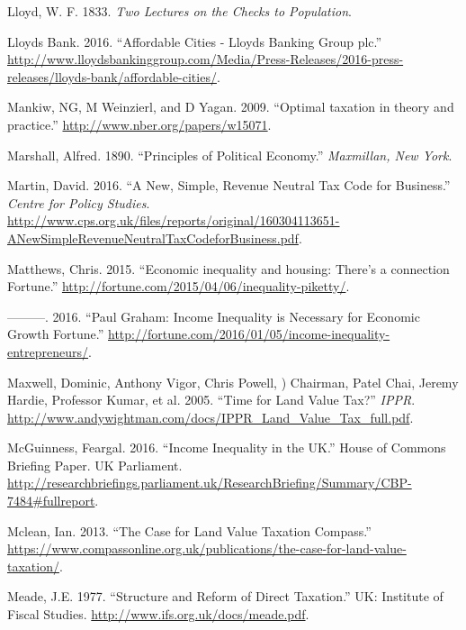 \documentclass[]{tufte-handout}
\begin{document}
\leavevmode\hypertarget{ref-Lloyd1833}{}%
Lloyd, W. F. 1833. \emph{Two Lectures on the Checks to Population}.

\leavevmode\hypertarget{ref-LloydsBank2016}{}%
Lloyds Bank. 2016. ``Affordable Cities - Lloyds Banking Group plc.''
\url{http://www.lloydsbankinggroup.com/Media/Press-Releases/2016-press-releases/lloyds-bank/affordable-cities/}.

\leavevmode\hypertarget{ref-Mankiw2009}{}%
Mankiw, NG, M Weinzierl, and D Yagan. 2009. ``Optimal taxation in theory
and practice.'' \url{http://www.nber.org/papers/w15071}.

\leavevmode\hypertarget{ref-marshall1890principles}{}%
Marshall, Alfred. 1890. ``Principles of Political Economy.''
\emph{Maxmillan, New York}.

\leavevmode\hypertarget{ref-Martin}{}%
Martin, David. 2016. ``A New, Simple, Revenue Neutral Tax Code for
Business.'' \emph{Centre for Policy Studies}.
\url{http://www.cps.org.uk/files/reports/original/160304113651-ANewSimpleRevenueNeutralTaxCodeforBusiness.pdf}.

\leavevmode\hypertarget{ref-Matthews}{}%
Matthews, Chris. 2015. ``Economic inequality and housing: There's a
connection \textbar{} Fortune.''
\url{http://fortune.com/2015/04/06/inequality-piketty/}.

\leavevmode\hypertarget{ref-Matthews2016}{}%
---------. 2016. ``Paul Graham: Income Inequality is Necessary for
Economic Growth \textbar{} Fortune.''
\url{http://fortune.com/2016/01/05/income-inequality-entrepreneurs/}.

\leavevmode\hypertarget{ref-Maxwell}{}%
Maxwell, Dominic, Anthony Vigor, Chris Powell, ) Chairman, Patel Chai,
Jeremy Hardie, Professor Kumar, et al. 2005. ``Time for Land Value
Tax?'' \emph{IPPR}.
\url{http://www.andywightman.com/docs/IPPR_Land_Value_Tax_full.pdf}.

\leavevmode\hypertarget{ref-McGuinness2016}{}%
McGuinness, Feargal. 2016. ``Income Inequality in the UK.'' House of
Commons Briefing Paper. UK Parliament.
\url{http://researchbriefings.parliament.uk/ResearchBriefing/Summary/CBP-7484\#fullreport}.

\leavevmode\hypertarget{ref-Mclean2013}{}%
Mclean, Ian. 2013. ``The Case for Land Value Taxation \textbar{}
Compass.''
\url{https://www.compassonline.org.uk/publications/the-case-for-land-value-taxation/}.

\leavevmode\hypertarget{ref-Meade1977}{}%
Meade, J.E. 1977. ``Structure and Reform of Direct Taxation.'' UK:
Institute of Fiscal Studies. \url{http://www.ifs.org.uk/docs/meade.pdf}.
\end{document}
